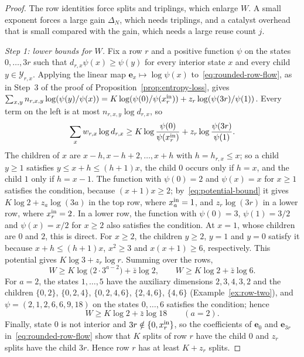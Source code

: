 \begin{proof}
The row identities force splits and triplings, which enlarge \(W\). A
small exponent forces a large gain \(\Delta_N\), which needs triplings,
and a catalyst overhead that is small compared with the gain, which
needs a large reuse count \(j\).

\emph{Step 1: lower bounds for \(W\).} Fix a row \(r\) and a positive
function \(\psi\) on the states \(0,\ldots,3r\) such that
\(d_{r,x}\psi(x)\ge\psi(y)\) for every interior state \(x\) and every
child \(y\in\mathcal Y_{r,x}\). Applying the linear map
\(\mathbf e_x\mapsto\log\psi(x)\) to~\eqref{eq:rounded-row-flow}, as in
Step~3 of the proof of Proposition~\ref{prop:entropy-loss}, gives
\(\sum_{x,y}n_{r,x,y}\log(\psi(y)/\psi(x))
=K\log(\psi(0)/\psi(x^{\mathrm{in}}_r))+z_r\log(\psi(3r)/\psi(1))\). Every term on
the left is at most \(n_{r,x,y}\log d_{r,x}\), so
\begin{equation}\label{eq:potential-bound}
 \sum_xw_{r,x}\log d_{r,x}
 \ge K\log\frac{\psi(0)}{\psi(x^{\mathrm{in}}_r)}+z_r\log\frac{\psi(3r)}{\psi(1)}.
\end{equation}
The children of \(x\) are \(x-h,x-h+2,\ldots,x+h\) with
\(h=h_{r,x}\le x\); so a child \(y\ge1\) satisfies
\(y\le x+h\le(h+1)x\), the child \(0\) occurs only if \(h=x\), and the
child \(1\) only if \(h=x-1\). The function with \(\psi(0)=2\) and
\(\psi(x)=x\) for \(x\ge1\) satisfies the condition, because
\((x+1)x\ge2\); by~\eqref{eq:potential-bound} it gives
\(K\log2+z_a\log(3a)\) in the top row, where \(x^{\mathrm{in}}_a=1\), and
\(z_r\log(3r)\) in a lower row, where \(x^{\mathrm{in}}_r=2\). In a lower row, the
function with \(\psi(0)=3\), \(\psi(1)=3/2\) and \(\psi(x)=x/2\) for
\(x\ge2\) also satisfies the condition. At \(x=1\), whose children are
\(0\) and \(2\), this is direct. For \(x\ge2\), the children \(y\ge2\),
\(y=1\) and \(y=0\) satisfy it because \(x+h\le(h+1)x\), \(x^2\ge3\) and
\(x(x+1)\ge6\), respectively. This potential gives
\(K\log3+z_r\log r\). Summing over the rows,
\begin{equation}\label{eq:W-lower}
 W\ge K\log\bigl(2\cdot3^{a-2}\bigr)+\bar z\log2,
 \qquad
 W\ge K\log2+\bar z\log6.
\end{equation}
For \(a=2\), the states \(1,\ldots,5\) have the auxiliary dimensions
\(2,3,4,3,2\) and the children \(\{0,2\}\), \(\{0,2,4\}\),
\(\{0,2,4,6\}\), \(\{2,4,6\}\), \(\{4,6\}\) (Example~\ref{ex:row-two}),
and \(\psi=(2,1,2,6,6,9,18)\) on the states \(0,\ldots,6\) satisfies the
condition; hence
\begin{equation}\label{eq:W-lower-two}
 W\ge K\log2+\bar z\log18\qquad(a=2).
\end{equation}
Finally, state \(0\) is not interior and \(3r\notin\{0,x^{\mathrm{in}}_r\}\), so the
coefficients of \(\mathbf e_0\) and \(\mathbf e_{3r}\)
in~\eqref{eq:rounded-row-flow} show that \(K\) splits of row \(r\) have
the child \(0\) and \(z_r\) splits have the child \(3r\). Hence row
\(r\) has at least \(K+z_r\) splits.


\end{proof}
